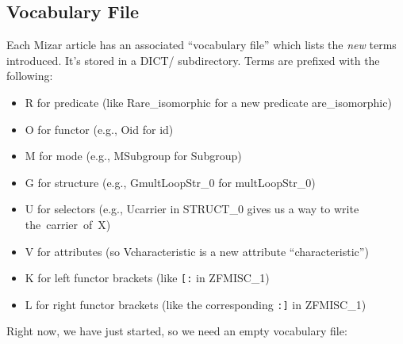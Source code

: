 \bigskip
{}
\subsection*{Vocabulary File}
Each Mizar article has an associated ``vocabulary file'' which lists the
\emph{new} terms introduced. It's stored in a {\Tt{}DICT/\nwendquote}
subdirectory. Terms are prefixed with the following:
\begin{itemize}
\item{} {\Tt{}R\nwendquote} for predicate (like {\Tt{}Rare{\_}isomorphic\nwendquote} for a new predicate {\Tt{}are{\_}isomorphic\nwendquote})
\item{} {\Tt{}O\nwendquote} for functor (e.g., {\Tt{}Oid\nwendquote} for {\Tt{}id\nwendquote})
\item{} {\Tt{}M\nwendquote} for mode (e.g., {\Tt{}MSubgroup\nwendquote} for {\Tt{}Subgroup\nwendquote})
\item{} {\Tt{}G\nwendquote} for structure (e.g., {\Tt{}GmultLoopStr{\_}0\nwendquote} for {\Tt{}multLoopStr{\_}0\nwendquote})
\item{} {\Tt{}U\nwendquote} for selectors (e.g., {\Tt{}Ucarrier\nwendquote} in {\Tt{}STRUCT{\_}0\nwendquote} gives us a
  way to write {\Tt{}the\ carrier\ of\ X\nwendquote})
\item{} {\Tt{}V\nwendquote} for attributes (so {\Tt{}Vcharacteristic\nwendquote} is a new attribute ``characteristic'')
\item{} {\Tt{}K\nwendquote} for left functor brackets (like \verb#[:# in {\Tt{}ZFMISC{\_}1\nwendquote})
\item{} {\Tt{}L\nwendquote} for right functor brackets (like the corresponding \verb#:]#
  in {\Tt{}ZFMISC{\_}1\nwendquote})
\end{itemize}

Right now, we have just started, so we need an empty vocabulary file:

\nwenddocs{}\endmoddef\nwstartdeflinemarkup{}\nwenddeflinemarkup

